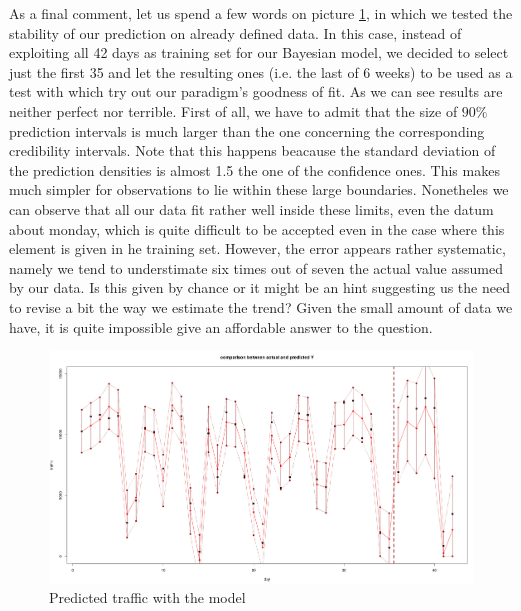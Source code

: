 \documentclass[11pt,twoside]{report}
\begin{document}
As a final comment, let us spend a few words on picture \ref{fig:pt}, in which we tested the stability of our prediction on already defined data. In this case, instead of exploiting all 42 days as training set for our Bayesian model, we decided to select just the first 35 and let the resulting ones (i.e. the last of 6 weeks) to be used as a test with which try out our paradigm's goodness of fit. As we can see results are neither perfect nor terrible. First of all, we have to admit that the size of $ 90\% $ prediction intervals is much larger than the one concerning the corresponding credibility intervals. Note that this happens beacause the standard deviation of the prediction densities is almost 1.5 the one of the confidence ones. This makes much simpler for observations to lie within these large boundaries. Nonetheles we can observe that all our data fit rather well inside these limits, even the datum about monday, which is quite difficult to be accepted even in the case where this element is given in he training set. However, the error appears rather systematic, namely we tend to understimate six times out of seven the actual value assumed by our data. Is this given by chance or it might be an hint suggesting us the need to revise a bit the way we estimate the trend? Given the small amount of data we have, it is quite impossible give an affordable answer to the question.

\begin{figure}[H]
	\centering
	\includegraphics[width=150 mm]{pictures/predicted_traffic.png}
	\caption{Predicted traffic with the model}
	\label{fig:pt}
\end{figure}
\end{document}
